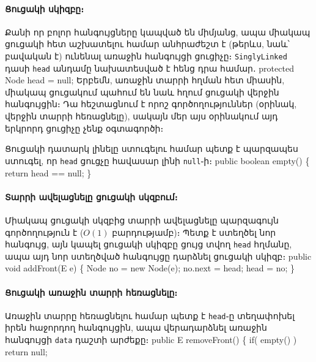 \paragraph{Ցուցակի սկիզբը։}
Քանի որ բոլոր հանգույցները կապված են միմյանց, ապա միակապ ցուցակի 
հետ աշխատելու համար անհրաժեշտ է (թերևս, նաև՝ բավական է) ունենալ 
առաջին հանգույցի ցուցիչը։ \texttt{SinglyLinked} դասի \texttt{head} 
անդամը նախատեսված է հենց դրա համար․
\nwenddocs{}\endmoddef{}
protected Node head = null;
\nwendcode{}\nwdocspar
Երբեմն, առաջին տարրի հղման հետ միասին, միակապ ցուցակում պահում 
են նաև հղում ցուցակի վերջին հանգույցին։ Դա հեշտացնում է որոշ 
գործողություններ (օրինակ, վերջին տարրի հեռացնելը), սակայն մեր 
այս օրինակում այդ երկրորդ ցուցիչը չենք օգտագործի։

\nwenddocs{}Ցուցակի դատարկ լինելը ստուգելու համար պետք է պարզապես 
ստուգել, որ \texttt{head} ցուցչը հավասար լինի \texttt{null}֊ի։
\nwenddocs{}\endmoddef{}
public boolean empty()
\{
    return head == null;
\}
\eatline
\nwendcode{}\nwdocspar

%
%
\paragraph{Տարրի ավելացնելը ցուցակի սկզբում։}
Միակապ ցուցակի սկզբից տարրի ավելացնելը պարզագույն գործողություն 
է (\(O(1)\) բարդությամբ)։ Պետք է ստեղծել նոր հանգույց, այն կապել 
ցուցակի սկիզբը ցույց տվող \texttt{head} հղմանը, ապա այդ նոր 
ստեղծված հանգույցը դարձնել ցուցակի սկիզբ։
\nwenddocs{}\endmoddef{}
public void addFront(E e)
\{
  Node no = new Node(e);
  no.next = head;
  head = no;
\}
\nwendcode{}\nwdocspar

%
%
\paragraph{Ցուցակի առաջին տարրի հեռացնելը։}
Առաջին տարրը հեռացնելու համար պետք է \texttt{head}֊ը տեղափոխել
իրեն հաջորդող հանգույցին, ապա վերադարձնել առաջին հանգույցի 
\texttt{data} դաշտի արժեքը։
\nwenddocs{}\endmoddef{}
public E removeFront()
\{
    if( empty() )
        return null;

